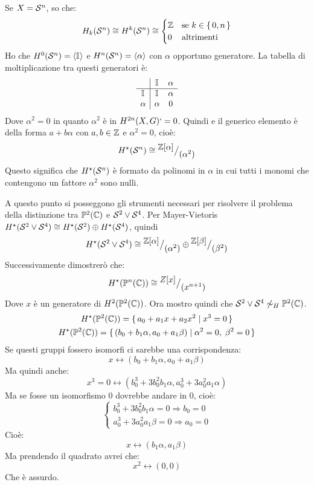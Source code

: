 \begin{example}
  Se $ X = \mathcal{S}^{n} $, so che:
  \[
    H_k(\mathcal{S}^{n}) \cong H^k(\mathcal{S}^{n}) \cong
    \begin{cases}
      \mathbb{Z} & \text{se } k \in \set{0,n} \\
      0 & \text{altrimenti}
    \end{cases}
  \]
  Ho che $ H^0(\mathcal{S}^{n}) = \langle\mathbb{I}_{}\rangle $ e $ H^n(\mathcal{S}^{n}) = \langle\alpha\rangle $ con $ \alpha $ opportuno
  generatore. La tabella di moltiplicazione tra questi generatori è:
  \[
    \begin{array}{c|cc}
      {} & \mathbb{I}_{} & \alpha \\ \hline
      \mathbb{I}_{} & \mathbb{I}_{} & \alpha \\
      \alpha  & \alpha & 0 \\
    \end{array}
  \]
  Dove $ \alpha^2 = 0 $ in quanto $ \alpha^2 $ è in $ H^{2n}(X, G) `= 0 $. Quindi e il
  generico elemento è della forma $ a + b \alpha $ con $ a,b \in \mathbb{Z} $ e
  $ \alpha^2 = 0 $, cioè:
  \[
    H^\star(\mathcal{S}^{n}) \cong {^{\textstyle \mathbb{Z}[\alpha]}\big/_{\textstyle (\alpha^2)}}
  \]
  Questo significa che $ H^\star(\mathcal{S}^{n}) $ è formato da polinomi in $ \alpha $ in cui
  tutti i monomi che contengono un fattore $ \alpha^2 $ sono nulli.
\end{example}
\begin{example}
  A questo punto si posseggono gli strumenti necessari per risolvere il problema della
  distinzione tra $ \mathbb{P}^{2} (\mathbb{C}) $ e $ \mathcal{S}^{2} \vee \mathcal{S}^{4} $.
  Per Mayer-Vietoris $ H^\star(\mathcal{S}^{2} \vee \mathcal{S}^{4}) \cong H^\star(\mathcal{S}^{2}) \oplus H^\star(\mathcal{S}^{4}) $, quindi
  \[
    H^\star(\mathcal{S}^{2} \vee \mathcal{S}^{4}) \cong {^{\textstyle \mathbb{Z}[\alpha]}\big/_{\textstyle (\alpha^2)}} \oplus {^{\textstyle \mathbb{Z}[\beta]}\big/_{\textstyle (\beta^2)}}
  \]
  Successivamente dimostrerò che:
  \[
    H^\star(\mathbb{P}^{n} (\mathbb{C})) \cong {^{\textstyle Z[x]}\big/_{\textstyle (x^{n+1})}}
  \]
  Dove $ x $ è un generatore di $ H^{2}(\mathbb{P}^{2} (\mathbb{C})) $.
  Ora mostro quindi che $ \mathcal{S}^{2} \vee \mathcal{S}^{4} \not \sim_H \mathbb{P}^{2} (\mathbb{C}) $.
  \begin{gather*}
    H^\star(\mathbb{P}^{2} (\mathbb{C})) = \set{a_0 + a_1 x + a_2 x^2 | x^3 = 0} \\
    H^\star(\mathbb{P}^{2} (\mathbb{C})) = \set{(b_0 + b_1 \alpha, a_0 + a_1 \beta) | \alpha^2 = 0, \; \beta^2 = 0}
  \end{gather*}
  Se questi gruppi fossero isomorfi ci sarebbe una corrispondenza:
  \[
    x \leftrightarrow (b_0 + b_1 \alpha, a_0 + a_1 \beta)
  \]
  Ma quindi anche:
  \[
    x^3 = 0 \leftrightarrow (b_0^3 + 3 b_0^2 b_1 \alpha, a_0^3 + 3 a_0^2 a_1 \alpha)
  \]
  Ma se fosse un isomorfismo $ 0 $ dovrebbe andare in $ 0 $, cioè:
  \[
    \begin{cases}
      b_0^3 + 3 b_0^2 b_1 \alpha = 0 \Rightarrow b_0 = 0  \\
      a_0^3 + 3 a_0^2 a_1 \beta = 0 \Rightarrow a_0 = 0
    \end{cases}
  \]
  Cioè:
  \[
    x \leftrightarrow  (b_1 \alpha, a_1 \beta)
  \]
  Ma prendendo il quadrato avrei che:
  \[
    x^2 \leftrightarrow  (0, 0)
  \]
  Che è assurdo.
\end{example}

